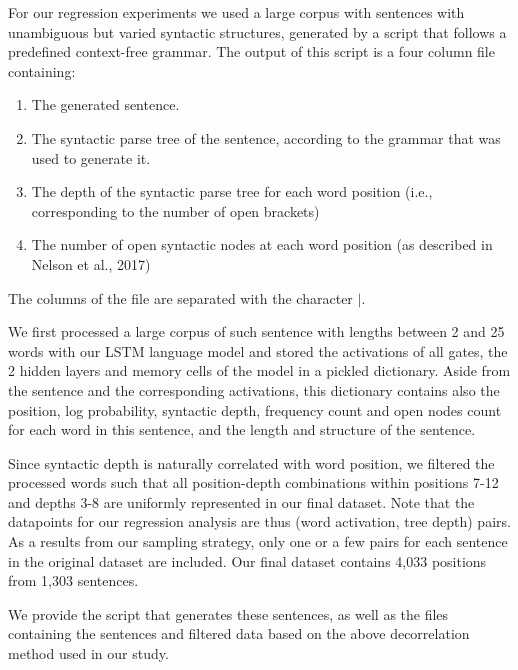 \documentclass{article}
\begin{document}
For our regression experiments we used a large corpus with sentences with unambiguous but varied syntactic structures, generated by a script that follows a predefined context-free grammar.
The output of this script is a four column file containing:\begin{enumerate}
    \item The generated sentence.
    \item The syntactic parse tree of the sentence, according to the grammar that was used to generate it.
    \item The depth of the syntactic parse tree for each word position (i.e., corresponding to the number of open brackets)
    \item The number of open syntactic nodes at each word position (as described in Nelson et al., 2017)
\end{enumerate}

\noindent The columns of the file are separated with the character $|$.

We first processed a large corpus of such sentence with lengths between 2 and 25 words with our LSTM language model and stored the activations of all gates, the 2 hidden layers and memory cells of the model in a pickled dictionary.
Aside from the sentence and the corresponding activations, this dictionary contains also the position, log probability, syntactic depth, frequency count and open nodes count for each word in this sentence, and the length and structure of the sentence.

Since syntactic depth is naturally correlated with word position, we filtered the processed words such that all position-depth combinations within positions 7-12 and depths 3-8 are uniformly represented in our final dataset.
Note that the datapoints for our regression analysis are thus (word activation, tree depth) pairs. As a results from our sampling strategy, only one or a few pairs for each sentence in the original dataset are included.
Our final dataset contains 4,033 positions from 1,303 sentences.

We provide the script that generates these sentences, as well as the files containing the sentences and filtered data based on the above decorrelation method used in our study.
\end{document}
